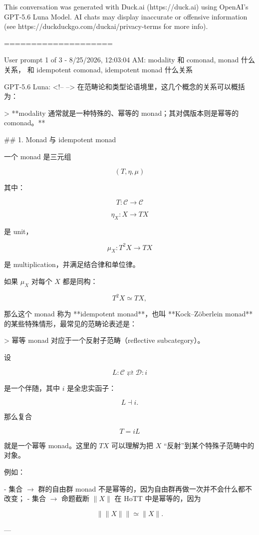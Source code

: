 \documentclass{ctexart}
\begin{document}
\begin{markdown}
This conversation was generated with Duck.ai (https://duck.ai) using OpenAI's GPT-5.6 Luna Model. AI chats may display inaccurate or offensive information (see https://duckduckgo.com/duckai/privacy-terms for more info).

====================

User prompt 1 of 3 - 8/25/2026, 12:03:04 AM:
modality 和 comonad, monad 什么关系， 和  idempotent comonad, idempotent monad 什么关系

GPT-5.6 Luna:
<!--  -->
在范畴论和类型论语境里，这几个概念的关系可以概括为：

> **modality 通常就是一种特殊的、幂等的 monad；其对偶版本则是幂等的 comonad。**

## 1. Monad 与 idempotent monad

一个 monad 是三元组

$$
(T,\eta,\mu)
$$

其中：

$$
T:\mathcal C\to\mathcal C
$$

$$
\eta_X:X\to TX
$$

是 unit，

$$
\mu_X:T^2X\to TX
$$

是 multiplication，并满足结合律和单位律。

如果 $\mu_X$ 对每个 $X$ 都是同构：

$$
T^2X \simeq TX,
$$

那么这个 monad 称为 **idempotent monad**，也叫 **Kock–Zöberlein monad** 的某些特殊情形，最常见的范畴论表述是：

> 幂等 monad 对应于一个反射子范畴（reflective subcategory）。

设

$$
L:\mathcal C\rightleftarrows \mathcal D:i
$$

是一个伴随，其中 $i$ 是全忠实函子：

$$
L\dashv i.
$$

那么复合

$$
T=iL
$$

就是一个幂等 monad。这里的 $TX$ 可以理解为把 $X$ “反射”到某个特殊子范畴中的对象。

例如：

- 集合 $\to$ 群的自由群 monad 不是幂等的，因为自由群再做一次并不会什么都不改变；
- 集合 $\to$ 命题截断 $\|X\|$ 在 HoTT 中是幂等的，因为

  $$
  \|\|X\|\|\simeq \|X\|.
  $$

---


\end{markdown}
\end{document}

